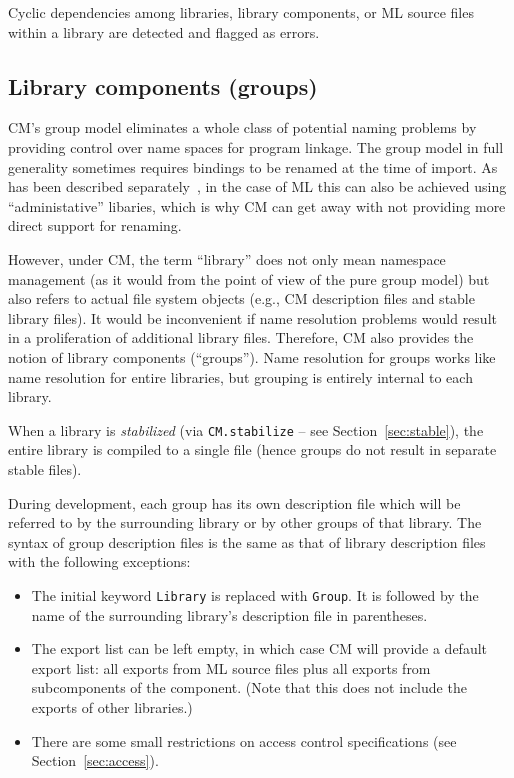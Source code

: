 \documentclass[titlepage,letterpaper]{article}
\begin{document}
Cyclic dependencies among libraries, library components, or ML source
files within a library are detected and flagged as errors.

\subsection{Library components (groups)}
\label{sec:groups}

CM's group model eliminates a whole class of potential naming problems
by providing control over name spaces for program linkage.  The group
model in full generality sometimes requires bindings to be renamed at
the time of import. As has been described
separately~\cite{blume:appel:cm99}, in the case of ML this can also be
achieved using ``administative'' libaries, which is why CM can get
away with not providing more direct support for renaming.

However, under CM, the term ``library'' does not only mean namespace
management (as it would from the point of view of the pure group
model) but also refers to actual file system objects (e.g., CM
description files and stable library files).  It would be inconvenient
if name resolution problems would result in a proliferation of
additional library files.  Therefore, CM also provides the notion of
library components (``groups'').  Name resolution for groups works
like name resolution for entire libraries, but grouping is entirely
internal to each library.

When a library is {\em stabilized} (via {\tt CM.stabilize} -- see
Section~\ref{sec:stable}), the entire library is compiled to a single
file (hence groups do not result in separate stable files).

During development, each group has its own description file which will
be referred to by the surrounding library or by other groups of that
library. The syntax of group description files is the same as that of
library description files with the following exceptions:

\begin{itemize}
\item The initial keyword {\tt Library} is replaced with {\tt Group}.
It is followed by the name of the surrounding library's description
file in parentheses.
\item The export list can be left empty, in which case CM will provide
a default export list: all exports from ML source files plus all
exports from subcomponents of the component.  (Note that this does not
include the exports of other libraries.)
\item There are some small restrictions on access control
specifications (see Section~\ref{sec:access}).
\end{itemize}
\end{document}
